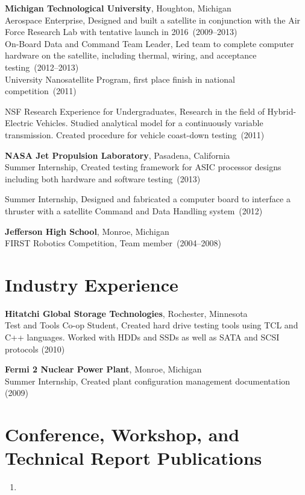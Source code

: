 \documentclass{article}
\begin{document}
{\bf Michigan Technological University}, Houghton, Michigan \\
Aerospace Enterprise, Designed and built a satellite in conjunction with the
Air Force Research Lab with tentative launch in 2016~(2009--2013) \\
On-Board Data and Command Team Leader, Led team to complete computer hardware
on the satellite, including thermal, wiring, and acceptance testing~(2012--2013) \\
University Nanosatellite Program, first place finish in national competition~(2011)

NSF Research Experience for Undergraduates, Research in the field of
Hybrid-Electric Vehicles. Studied analytical model for a continuously variable
transmission. Created procedure for vehicle coast-down testing~(2011)


{\bf NASA Jet Propulsion Laboratory}, Pasadena, California \\
Summer Internship, Created testing framework for ASIC processor designs
including both hardware and software testing~(2013)

Summer Internship, Designed and fabricated a computer board to interface a
thruster with a satellite Command and Data Handling system~(2012)

{\bf Jefferson High School}, Monroe, Michigan \\
FIRST Robotics Competition, Team member~(2004--2008)


\section*{Industry Experience}
\vspace{-6pt}

{\bf Hitatchi Global Storage Technologies}, Rochester, Minnesota \\
Test and Tools Co-op Student, Created hard drive testing tools using TCL and
C++ languages. Worked with HDDs and SSDs as well as SATA and SCSI protocols (2010)

{\bf Fermi 2 Nuclear Power Plant}, Monroe, Michigan \\
Summer Internship, Created plant configuration management documentation (2009)


\section*{Conference, Workshop, and Technical Report Publications}
\begin{enumerate}

   \item {}

\end{enumerate}
\end{document}
